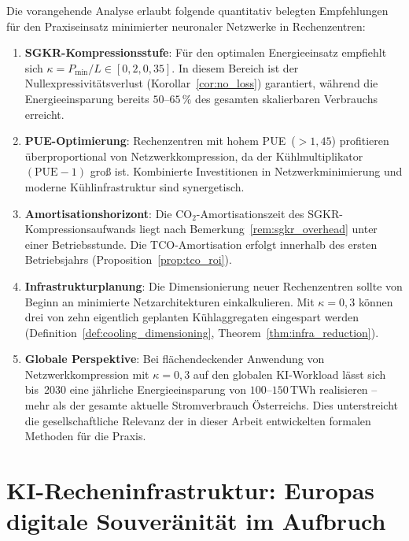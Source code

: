 \documentclass[12pt, a4paper, openany]{report}
\begin{document}
Die vorangehende Analyse erlaubt folgende quantitativ belegten Empfehlungen
für den Praxiseinsatz minimierter neuronaler Netzwerke in Rechenzentren:

\begin{enumerate}[label=(\arabic*)]
  \item \textbf{SGKR-Kompressionsstufe}: Für den optimalen
    Energieeinsatz empfiehlt sich $\kappa = P_{\min}/L \in [0{,}2, 0{,}35]$.
    In diesem Bereich ist der Nullexpressivitätsverlust (Korollar~\ref{cor:no_loss})
    garantiert, während die Energieeinsparung bereits $50$--$65\,\%$ des
    gesamten skalierbaren Verbrauchs erreicht.

  \item \textbf{PUE-Optimierung}: Rechenzentren mit hohem PUE~($>1{,}45$)
    profitieren überproportional von Netzwerkkompression, da der
    Kühlmultiplikator $(\mathrm{PUE}-1)$ groß ist.  Kombinierte
    Investitionen in Netzwerkminimierung und moderne Kühlinfrastruktur
    sind synergetisch.

  \item \textbf{Amortisationshorizont}: Die CO$_2$-Amortisa\-tionszeit
    des SGKR-Kompressions\-aufwands liegt nach
    Bemerkung~\ref{rem:sgkr_overhead} unter einer Betriebsstunde.
    Die TCO-Amortisa\-tion erfolgt innerhalb des ersten Betriebsjahrs
    (Proposition~\ref{prop:tco_roi}).

  \item \textbf{Infrastrukturplanung}: Die Dimensionierung neuer
    Rechenzentren sollte von Beginn an minimierte Netzarchitekturen
    einkalkulieren.  Mit $\kappa = 0{,}3$ können drei von zehn
    eigentlich geplanten Kühlaggregaten eingespart werden
    (Definition~\ref{def:cooling_dimensioning}, Theorem~\ref{thm:infra_reduction}).

  \item \textbf{Globale Perspektive}: Bei flächendeckender Anwendung von
    Netzwerkkompression mit $\kappa = 0{,}3$ auf den globalen KI-Workload
    lässt sich bis~2030 eine jährliche Energieeinsparung von
    $100$--$150\,\mathrm{TWh}$ realisieren -- mehr als der gesamte aktuelle
    Stromverbrauch Österreichs.  Dies unterstreicht die gesellschaftliche
    Relevanz der in dieser Arbeit entwickelten formalen Methoden für die
    Praxis.
\end{enumerate}

\chapter{KI-Recheninfrastruktur: Europas digitale Souveränität im Aufbruch}
\label{sec:ki_infrastruktur}
\end{document}
